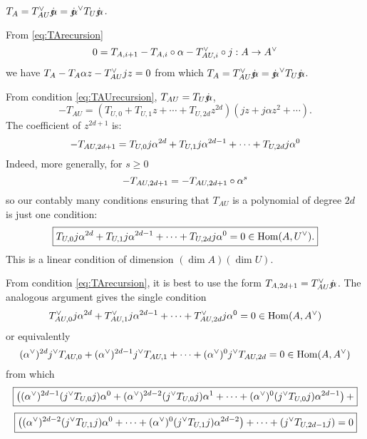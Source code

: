 { {\em $T_A = T_{AU}^\vee \mathord{j\mkern-7mu\alpha} = \mathord{j\mkern-7mu\alpha}^\vee T_U \mathord{j\mkern-7mu\alpha}$.}

\bpf From \eqref{eq:TArecursion}
$$
0 = T_{A, i+1} - T_{A,i} \circ \alpha - T_{AU,i}^\vee \circ j : A \rightarrow A^\vee$$
we have
$T_A - T_A \alpha z - T_{AU}^\vee j z = 0$ from which $T_A = T_{AU}^\vee \mathord{j\mkern-7mu\alpha} = \mathord{j\mkern-7mu\alpha}^\vee T_U \mathord{j\mkern-7mu\alpha}$. \epf


From condition \eqref{eq:TAUrecursion}, $T_{AU} = T_U \mathord{j\mkern-7mu\alpha}$,
$$
-T_{AU} = \left( T_{U,0} + T_{U,1} z + \cdots + T_{U,2d} z^{2d} \right) \left( jz + j \alpha z ^2 + \cdots \right).$$
The coefficient of $z^{2d+1}$ is:
$$
-T_{AU,2d+1}=T_{U,0} j \alpha^{2d} + T_{U,1} j \alpha^{2d-1} + \cdots + T_{U,2d} j \alpha^0
$$
Indeed, more generally, for $s \geq 0$
$$
-T_{AU,2d+1}=-T_{AU,2d+1} \circ \alpha^s
$$
so our contably many conditions ensuring that $T_{AU}$ is a polynomial of degree $2d$ is just one condition:
\begin{equation}\label{eq:first}
\boxed{T_{U,0} j \alpha^{2d} + T_{U,1} j \alpha^{2d-1} + \cdots + T_{U,2d} j \alpha^0 = 0 \in \operatorname{Hom}(A, U^\vee).}
\end{equation}
This is a linear condition of dimension $(\dim A)(\dim U)$.




From condition \eqref{eq:TArecursion}, it is best to use the form $T_{A,2d+1} = T_{AU}^\vee \mathord{j\mkern-7mu\alpha}$.
The analogous argument gives the single condition
$$
T^\vee_{AU,0} j \alpha^{2d} + T^\vee_{AU,1} j \alpha^{2d-1} + \cdots + T^\vee_{AU,2d} j \alpha^0 = 0 \in \operatorname{Hom}(A, A^\vee)
$$
or equivalently 
$$
(\alpha^\vee)^{2d} j^\vee T_{AU,0}  + (\alpha^\vee)^{2d-1} j^\vee T_{AU,1} + \cdots + (\alpha^\vee)^0 j^\vee T_{AU,2d} = 0 \in \operatorname{Hom}(A, A^\vee)
$$
from which
\begin{equation}\label{eq:second}\boxed{
\left(   (\alpha^\vee)^{2d-1}  ( j^\vee T_{U,0} j)   \alpha^0 + 
  (\alpha^\vee)^{2d-2}  ( j^\vee T_{U,0} j)   \alpha^1 +  \cdots  +
  (\alpha^\vee)^{0}  ( j^\vee T_{U,0} j)   \alpha^{2d-1} \right) +  }\end{equation}
$$
\boxed{\left(   (\alpha^\vee)^{2d-2}  ( j^\vee T_{U,1} j)   \alpha^0 +   \cdots  +
    (\alpha^\vee)^{0}  ( j^\vee T_{U,1} j)   \alpha^{2d-2} \right) + \cdots + 
\left( j^\vee T_{U,2d-1} j \right) = 0}$$


}
